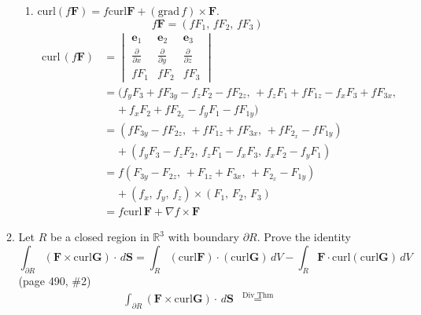 \documentclass{article}
\newcommand{\parti}[1]{\frac{\partial}{\partial #1}}
\begin{document}
\begin{enumerate}
\begin{enumerate}
\begin{enumerate}[label=(\roman*)]
            \item curl$(f \boldsymbol F) 
            = f \text{curl} \boldsymbol F 
            + (\text{grad}\, f) \times \boldsymbol F$.
            \[ f \boldsymbol F = ( f F_1,\, f F_2,\, f F_3)\]
            \begin{align*}
                \text{curl}\, (f \boldsymbol F) &=
                \begin{vmatrix}
                        \boldsymbol e_1 & \boldsymbol e_2 & \boldsymbol e_3 \\
                        \parti{x} & \parti{y} & \parti{z} \\
                        f F_1 & f F_2 & f F_3 
                \end{vmatrix} \\
                &= (f_y F_3 + f F_{3y} - f_z F_2 - f F_{2z},\, 
                    + f_z F_1 + f F_{1z} - f_x F_3 + f F_{3x}, \\
                &\; \; \; \; + f_x F_2 + f F_{2_x} - f_y F_1 - f F_{1y}) \\
                &= (f F_{3y} - f F_{2z},\, + f F_{1z} + f F_{3x},\, 
                    + f F_{2_x} - f F_{1y}) \\
                &\; \; \; \; + (f_y F_3 - f_z F_2,\, 
                f_z F_1 - f_x F_3,\, f_x F_2 - f_y F_1) \\
                &= f (F_{3y} - F_{2z},\, + F_{1z} + F_{3x},\, 
                    + F_{2_x} - F_{1y}) \\
                &\; \; \; \; + (f_x,\, f_y,\, f_z) \times
                (F_1,\, F_2,\, F_3) \\
                &= f \text{curl}\, \boldsymbol F 
                + \nabla f \times \boldsymbol F
                \end{align*} 
        \end{enumerate}
        \item Let $R$ be a closed region in $\mathbb{R}^3$ with boundary 
        $\partial R$. Prove the identity
        \[\int_{\partial R} ( \boldsymbol F \times \text{curl} \boldsymbol G) 
        \cdot \, d \boldsymbol S = 
        \int_R(\text{curl} \boldsymbol F ) 
        \cdot (\text{curl} \boldsymbol G) \, dV 
        - \int_R \boldsymbol F 
        \cdot \text{curl}(\text{curl} \boldsymbol G ) \, dV\]
        (page 490, \#2)
        \begin{align*}
        \int_{\partial R} ( \boldsymbol F \times \text{curl} \boldsymbol G) 
        \cdot \, d \boldsymbol S & \overset{\text{Div Thm}}{=} 

\end{align*}
\end{enumerate}
\end{enumerate}
\end{document}
